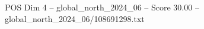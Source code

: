 \begin{textsample}{POS Dim 4 – global\_north\_2024\_06 – Score 30.00 – global\_north\_2024\_06/108691298.txt}
\end{textsample}
